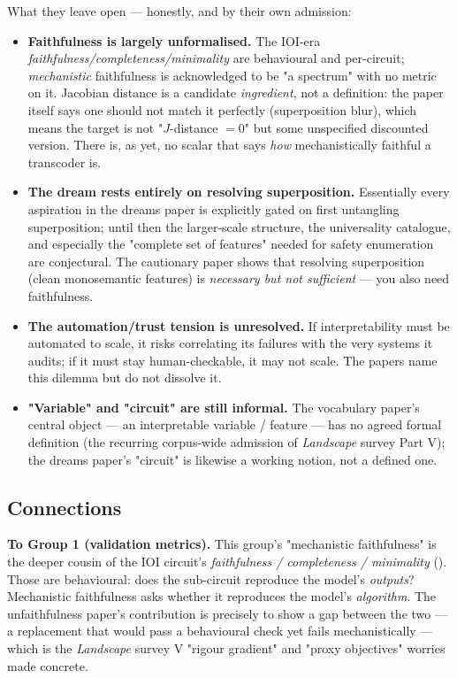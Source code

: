 What they leave open --- honestly, and by their own admission:
\begin{itemize}
\item \textbf{Faithfulness is largely unformalised.} The IOI-era \emph{faithfulness/completeness/minimality} are behavioural and per-circuit; \emph{mechanistic} faithfulness is acknowledged to be "a spectrum" with no metric on it. Jacobian distance is a candidate \emph{ingredient}, not a definition: the paper itself says one should not match it perfectly (superposition blur), which means the target is not "$J$-distance $=0$" but some unspecified discounted version. There is, as yet, no scalar that says \emph{how} mechanistically faithful a transcoder is.
\item \textbf{The dream rests entirely on resolving superposition.} Essentially every aspiration in the dreams paper is explicitly gated on first untangling superposition; until then the larger-scale structure, the universality catalogue, and especially the "complete set of features" needed for safety enumeration are conjectural. The cautionary paper shows that resolving superposition (clean monosemantic features) is \emph{necessary but not sufficient} --- you also need faithfulness.
\item \textbf{The automation/trust tension is unresolved.} If interpretability must be automated to scale, it risks correlating its failures with the very systems it audits; if it must stay human-checkable, it may not scale. The papers name this dilemma but do not dissolve it.
\item \textbf{"Variable" and "circuit" are still informal.} The vocabulary paper's central object --- an interpretable variable / feature --- has no agreed formal definition (the recurring corpus-wide admission of \emph{Landscape} survey Part V); the dreams paper's "circuit" is likewise a working notion, not a defined one.
\end{itemize}


\subsection*{Connections}

\textbf{To Group 1 (validation metrics).} This group's "mechanistic faithfulness" is the deeper cousin of the IOI circuit's \emph{faithfulness / completeness / minimality} (\textcite{interpretability-in-the-wild-ioi}). Those are behavioural: does the sub-circuit reproduce the model's \emph{outputs}? Mechanistic faithfulness asks whether it reproduces the model's \emph{algorithm}. The unfaithfulness paper's contribution is precisely to show a gap between the two --- a replacement that would pass a behavioural check yet fails mechanistically --- which is the \emph{Landscape} survey V "rigour gradient" and "proxy objectives" worries made concrete.

